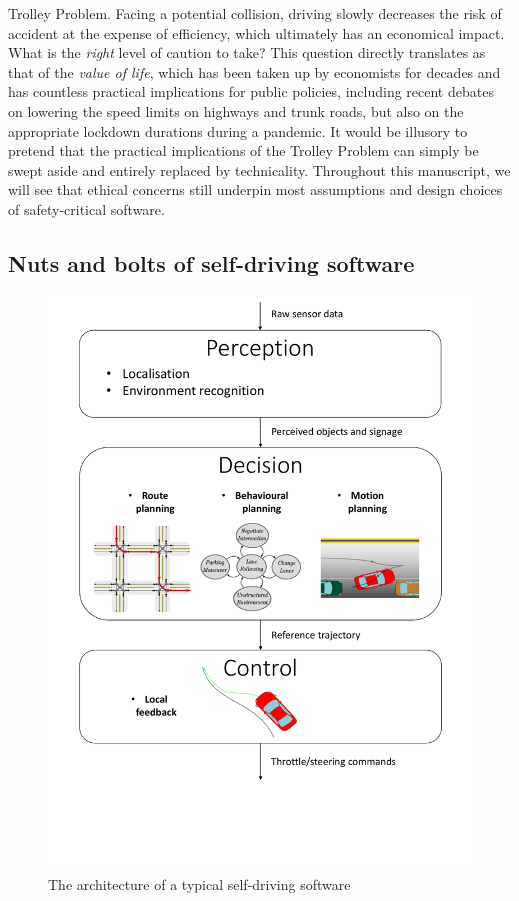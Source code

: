 Trolley Problem. Facing a potential collision, driving slowly decreases the risk of accident at the expense of efficiency, which ultimately has an economical impact. What is the \emph{right} level of caution to take? This question directly translates as that of the \emph{value of life}, which has been taken up by economists for decades \citep{Abraham1960,Dreze1962,Schelling1968life,Banzhaf2014,Tirole2017,Charpentier2019} and has countless practical implications for public policies, including recent debates on lowering the speed limits on highways and trunk roads, but also on the appropriate lockdown durations during a pandemic.
It would be illusory to pretend that the practical implications of the Trolley Problem can simply be swept aside and entirely replaced by technicality. Throughout this manuscript, we will see that ethical concerns still underpin most assumptions and design choices of safety-critical software.


\subsection{Nuts and bolts of self-driving software}
\label{sec:nuts-and-bolts}

\begin{figure}[th]
	\centering
	\includegraphics[trim={0 5cm 0 0}, clip, width=0.7\linewidth]{img/pipeline}
	\caption{The architecture of a typical self-driving software}
	\label{fig:robotics-pipeline}
\end{figure}

